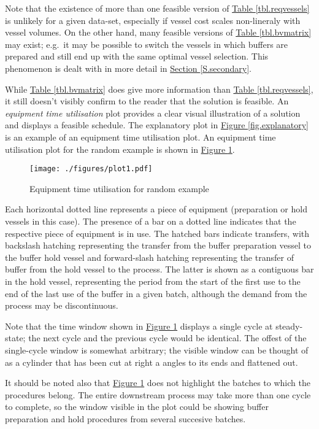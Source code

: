 Note that the existence of more than one feasible version of 
\hyperref[tbl.reqvessels]{Table \ref*{tbl.reqvessels}} is unlikely for a given
data-set, especially if vessel cost scales non-lineraly with vessel volumes.
On the other hand, many feasible versions of
\hyperref[tbl.bvmatrix]{Table \ref*{tbl.bvmatrix}} may exist; e.g.\ it may be
possible to switch the vessels in which buffers are prepared and still end up
with the same optimal vessel selection.
This phenomenon is dealt with in more detail in 
\hyperref[S.secondary]{Section \ref*{S.secondary}}.

While \hyperref[tbl.bvmatrix]{Table \ref*{tbl.bvmatrix}} does give more
information than \hyperref[tbl.reqvessels]{Table \ref*{tbl.reqvessels}},
it still doesn't visibly confirm to the reader that the solution is feasible.
An \emph{equipment time utilisation} plot provides a clear visual illustration
of a solution and displays a feasible schedule.
The explanatory plot in 
\hyperref[fig.explanatory]{Figure \ref*{fig.explanatory}} is an example of an
equipment time utilisation plot.  
An equipment time utilisation plot for the random example is shown in
\hyperref[fig.etu1]{Figure \ref*{fig.etu1}}.
\begin{figure}
    \centering
    \texttt{[image: ./figures/plot1.pdf]}
    \caption{Equipment time utilisation for random example}
    \label{fig.etu1}
\end{figure}
Each horizontal dotted line represents a piece of equipment (preparation or
hold vessels in this case).
The presence of a bar on a dotted line indicates that the respective piece of
equipment is in use.  
The hatched bars indicate transfers, with backslash hatching representing the
transfer from the buffer preparation vessel to the buffer hold vessel and
forward-slash hatching representing the transfer of buffer from the hold vessel
to the process.
The latter is shown as a contiguous bar in the hold vessel, representing the
period from the start of the first use to the end of the last use of the buffer
in a given batch, although the demand from the process may be discontinuous.

Note that the time window shown in \hyperref[fig.etu1]{Figure \ref*{fig.etu1}}
displays a single cycle at steady-state; the next cycle and the previous cycle
would be identical.
The offest of the single-cycle window is somewhat arbitrary; the
visible window can be thought of as a cylinder that has been cut at right a
angles to its ends and flattened out.

It should be noted also that \hyperref[fig.etu1]{Figure \ref*{fig.etu1}}
does not highlight the batches to which the procedures belong.
The entire downstream process may take more than one cycle to complete, so the
window visible in the plot could be showing buffer preparation and hold
procedures from several succesive batches.

